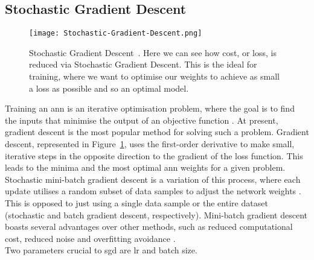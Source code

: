 \subsection{Stochastic Gradient Descent}
\begin{figure}
\centering
\texttt{[image: Stochastic-Gradient-Descent.png]}
\caption[Stochastic Gradient Descent.]{Stochastic Gradient Descent~\cite{sgd_diagram}. Here we can see how cost, or loss, is reduced via Stochastic Gradient Descent. This is the ideal for training, where we want to optimise our weights to achieve as small a loss as possible and so an optimal model.}
\label{fig:Stochastic Gradient Descent}
\end{figure}
Training an \acrshort{ann} is an iterative optimisation problem, where the goal is to find the inputs that minimise the output of an objective function \cite{Stochastic-gradient-descent}. At present, gradient descent is the most popular method for solving such a problem. Gradient descent, represented in Figure~\ref{fig:Stochastic Gradient Descent}, uses the first-order derivative to make small, iterative steps in the opposite direction to the gradient of the loss function. This leads to the minima and the most optimal \acrshort{ann} weights for a given problem.\\
Stochastic mini-batch gradient descent is a variation of this process, where each update utilises a random subset of data samples to adjust the network weights \cite{Stochastic-gradient-descent}. This is opposed to just using a single data sample or the entire dataset (stochastic and batch gradient descent, respectively). Mini-batch gradient descent boasts several advantages over other methods, such as reduced computational cost, reduced noise and \gls{overfitting} avoidance \cite{Stochastic-gradient-descent}.\\
Two parameters crucial to \acrshort{sgd} are \acrlong{lr} and batch size.\\
